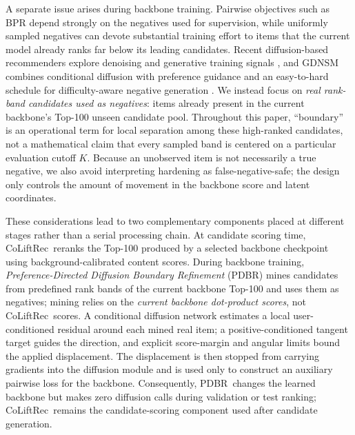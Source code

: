\documentclass[sigconf,anonymous,review]{acmart}
\newcommand{\methodname}{CoLiftRec}
\newcommand{\pdbr}{PDBR}
\begin{document}
A separate issue arises during backbone training.
Pairwise objectives such as BPR \cite{rendle2009bpr} depend strongly on the negatives used for supervision, while uniformly sampled negatives can devote substantial training effort to items that the current model already ranks far below its leading candidates.
Recent diffusion-based recommenders explore denoising and generative training signals \cite{jiang2024diffmm}, and GDNSM combines conditional diffusion with preference guidance and an easy-to-hard schedule for difficulty-aware negative generation \cite{ma2025gdnsm}.
We instead focus on \emph{real rank-band candidates used as negatives}: items already present in the current backbone's Top-100 unseen candidate pool.
Throughout this paper, ``boundary'' is an operational term for local separation among these high-ranked candidates, not a mathematical claim that every sampled band is centered on a particular evaluation cutoff $K$.
Because an unobserved item is not necessarily a true negative, we also avoid interpreting hardening as false-negative-safe; the design only controls the amount of movement in the backbone score and latent coordinates.

These considerations lead to two complementary components placed at different stages rather than a serial processing chain.
At candidate scoring time, \methodname\ reranks the Top-100 produced by a selected backbone checkpoint using background-calibrated content scores.
During backbone training, \emph{Preference-Directed Diffusion Boundary Refinement} (\pdbr) mines candidates from predefined rank bands of the current backbone Top-100 and uses them as negatives; mining relies on the \emph{current backbone dot-product scores}, not \methodname\ scores.
A conditional diffusion network estimates a local user-conditioned residual around each mined real item; a positive-conditioned tangent target guides the direction, and explicit score-margin and angular limits bound the applied displacement.
The displacement is then stopped from carrying gradients into the diffusion module and is used only to construct an auxiliary pairwise loss for the backbone.
Consequently, \pdbr\ changes the learned backbone but makes zero diffusion calls during validation or test ranking; \methodname\ remains the candidate-scoring component used after candidate generation.
\end{document}
